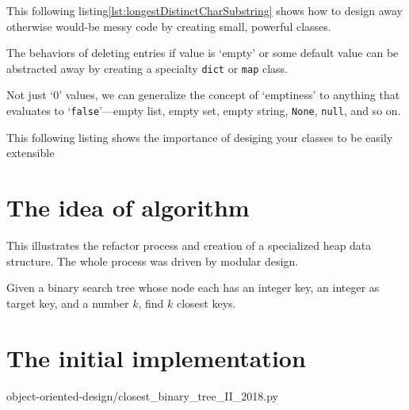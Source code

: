 \documentclass[oneside,11pt]{book}
\theoremstyle{definition}
\theoremstyle{remark}
\newcommand{\code}[1]{\mbox{\lstinline{#1}}}
\begin{document}
This following listing\ref{lst:longestDistinctCharSubstring} shows how to design away
otherwise would-be messy code by creating small, powerful classes.

The behaviors of deleting entries if value is `empty' or some default value can be abstracted
away by creating a specialty \code{dict} or \code{map} class.

Not just `$0$' values, we can generalize the concept of `emptiness' to anything that evaluates to
`\code{false}'---empty list, empty set, empty string, \code{None}, \code{null}, and so on.


\label{Evernote:Longest Substring with At Most K Distinct Characters}

This following listing shows the importance of desiging your classes to be easily extensible


\label{Evernote:Flatten 2D Vector}


\label{Evernote:Flatten 3D vector}

\section{The idea of algorithm}\label{sec:algorithm}

This illustrates the refactor process and creation of a specialized heap data structure.
The whole process was driven by modular design.

Given a binary search tree whose node each has an integer key, an integer as target key, and a
number $k$, find $k$ closest keys.

\section{The initial implementation}


{object-oriented-design/closest_binary_tree_II_2018.py}
\end{document}
